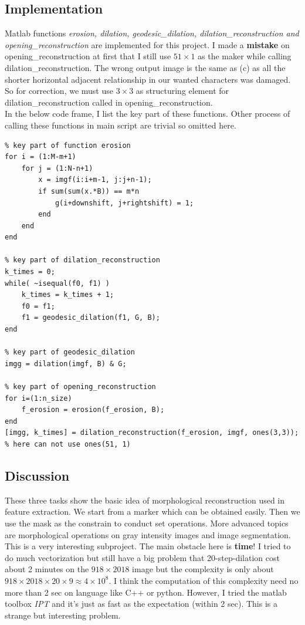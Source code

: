 \subsection{Implementation}
Matlab functions \emph{erosion, dilation, geodesic\_dilation, dilation\_reconstruction and opening\_reconstruction} are implemented for this project. I made a \textbf{mistake} on opening\_reconstruction at first that I still use $51 \times 1$ as the maker while calling dilation\_reconstruction. The wrong output image is the same as (c) as all the shorter horizontal adjacent relationship in our wanted characters was damaged. So for correction, we must use $3 \times 3$ as structuring element for dilation\_reconstruction called in opening\_reconstruction. \\
In the below code frame, I list the key part of these functions. Other process of calling these functions in main script are trivial so omitted here.\\
\lstset{language=Matlab}
\begin{lstlisting}
% key part of function erosion
for i = (1:M-m+1)
    for j = (1:N-n+1)
        x = imgf(i:i+m-1, j:j+n-1);
        if sum(sum(x.*B)) == m*n
            g(i+downshift, j+rightshift) = 1;
        end
    end
end

% key part of dilation_reconstruction 
k_times = 0;
while( ~isequal(f0, f1) )
    k_times = k_times + 1;
    f0 = f1;
    f1 = geodesic_dilation(f1, G, B);
end

% key part of geodesic_dilation
imgg = dilation(imgf, B) & G;

% key part of opening_reconstruction
for i=(1:n_size)
    f_erosion = erosion(f_erosion, B);
end
[imgg, k_times] = dilation_reconstruction(f_erosion, imgf, ones(3,3)); % here can not use ones(51, 1)
\end{lstlisting}

\subsection{Discussion}
These three tasks show the basic idea of morphological reconstruction used in feature extraction. We start from a marker which can be  obtained easily. Then we use the mask as the constrain to conduct set operations. More advanced topics are morphological operations on gray intensity images and image segmentation. This is a very interesting subproject.
The main obstacle here is \textbf{time}! I tried to do much vectorization but still have a big problem that 20-step-dilation cost about 2 minutes on the $918\times 2018$ image but the complexity is only about $918 \times 2018 \times 20 \times 9 \approx 4 \times 10^8$. I think the computation of this complexity need no more than 2 sec on language like C++ or python. However, I tried the matlab toolbox \emph{IPT} and it's just as fast as the expectation (within 2 sec). This is a strange but interesting problem.
